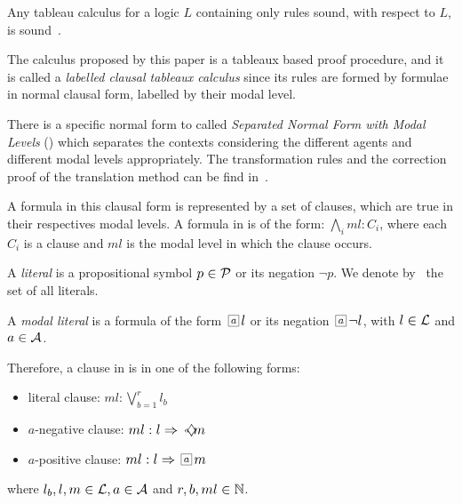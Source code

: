 Any tableau calculus for a logic $L$ containing only rules sound, with respect
to $L$, is sound~\cite{gore2009clausal}.

The calculus proposed by this paper is a tableaux based proof procedure, and it
is called a \emph{labelled clausal tableaux calculus} since its rules are formed
by formulae in normal clausal form, labelled by their modal level.

There is a specific normal form to  called \emph{Separated Normal
Form with Modal Levels} () which separates the contexts considering the
different agents and different modal levels appropriately. The transformation
rules and the correction proof of the translation method can be find
in~\cite{nalon2015modal}.

A formula in this clausal form is represented by a set of clauses, which are
true in their respectives modal levels. A formula in  is of the form:
$\bigwedge_i ml : C_i$,
where each $C_i$ is a clause and $ml$ is the modal level in which the clause
occurs.

\begin{definition}
    A \emph{literal} is a propositional symbol $p \in \Prop$ or its negation
    $\neg p$. We denote by \Literals~the set of all literals. 
\end{definition}

\begin{definition}
    A \emph{modal literal} is a formula of the form $\nec{a} l$ or its negation
    $\nec{a} \neg l$, with $l \in \Literals$ and $a \in \Agents$.
\end{definition}

Therefore, a clause in  is in one of the following forms:
\begin{itemize}
    \item literal clause:
        $
        ml: \bigvee^r_{b=1} l_b
        $
    \item $a$-negative clause:
        $
        ml: l \then \pos{a}m
        $
    \item $a$-positive clause:
        $
        ml: l \then \nec{a}m
        $
\end{itemize}
where $l_b, l, m \in \Literals, a \in \Agents$ and $r,b,ml \in \Nat$.


